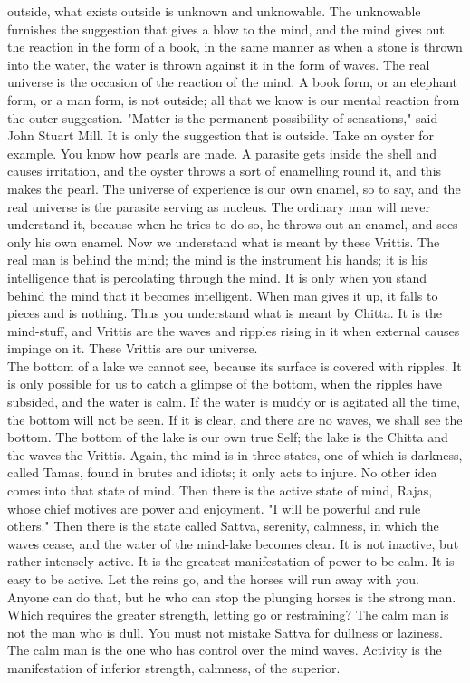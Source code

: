 outside, what exists outside is unknown and unknowable. The unknowable
furnishes the suggestion that gives a blow to the mind, and the mind
gives out the reaction in the form of a book, in the same manner as
when a stone is thrown into the water, the water is thrown against it
in the form of waves. The real universe is the occasion of the reaction
of the mind. A book form, or an elephant form, or a man form, is not
outside; all that we know is our mental reaction from the outer
suggestion. "Matter is the permanent possibility of sensations," said
John Stuart Mill. It is only the suggestion that is outside. Take an
oyster for example. You know how pearls are made. A parasite gets
inside the shell and causes irritation, and the oyster throws a sort of
enamelling round it, and this makes the pearl. The universe of
experience is our own enamel, so to say, and the real universe is the
parasite serving as nucleus. The ordinary man will never understand it,
because when he tries to do so, he throws out
an enamel, and sees only his own enamel. Now we understand what is
meant by these Vrittis. The real man is behind the mind; the mind is
the instrument his hands; it is his intelligence that is percolating
through the mind. It is only when you stand behind the mind that it
becomes intelligent. When man gives it up, it falls to pieces and is
nothing. Thus you understand what is meant by Chitta. It is the
mind-stuff, and Vrittis are the waves and ripples rising in it when
external causes impinge on it. These Vrittis are our universe. \\

The bottom of a lake we cannot see, because its surface is
covered with ripples. It is only possible for us to catch a glimpse of
the bottom, when the ripples have subsided, and the water is calm. If
the water is muddy or is agitated all the time, the bottom will not be
seen. If it is clear, and there are no waves, we shall see the bottom.
The bottom of the lake is our own true Self; the lake is the Chitta and
the waves the Vrittis. Again, the mind is in three states, one of which
is darkness, called Tamas, found in brutes and idiots; it only acts to
injure. No other idea comes into that state of mind. Then there is the
active state of mind, Rajas, whose chief motives are power and
enjoyment. "I will be powerful and rule others." Then there is the
state called Sattva, serenity, calmness, in which the waves cease, and
the water of the mind-lake becomes clear. It is not inactive, but
rather intensely active. It is the greatest manifestation of power to
be calm. It is easy to be active. Let the reins go, and the horses will
run away with you. Anyone can do that, but he who can stop the plunging
horses is the strong man. Which requires the greater strength, letting
go or restraining? The calm man is not the man who is dull. You must
not mistake Sattva for dullness or laziness. The calm man is the one
who has control over the mind waves. Activity is the manifestation of
inferior strength, calmness, of the superior. \\

